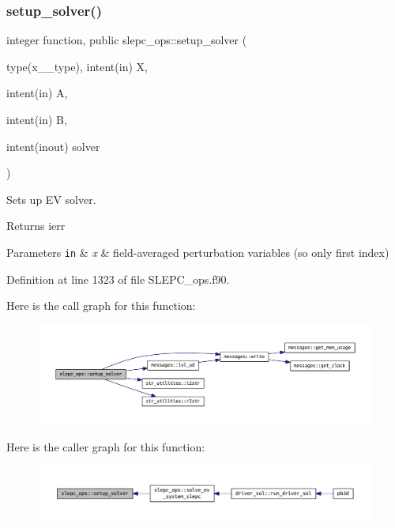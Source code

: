 \subsubsection{\texorpdfstring{setup\+\_\+solver()}{setup\_solver()}}
{\footnotesize\ttfamily integer function, public slepc\+\_\+ops\+::setup\+\_\+solver (\begin{DoxyParamCaption}\item[{type(x\+\_\+2\+\_\+type), intent(in)}]{X,  }\item[{intent(in)}]{A,  }\item[{intent(in)}]{B,  }\item[{intent(inout)}]{solver }\end{DoxyParamCaption})}



Sets up EV solver. 

\begin{DoxyReturn}{Returns}
ierr
\end{DoxyReturn}

\begin{DoxyParams}[1]{Parameters}
\mbox{\tt in}  & {\em x} & field-\/averaged perturbation variables (so only first index) \\
\hline
\end{DoxyParams}


Definition at line 1323 of file S\+L\+E\+P\+C\+\_\+ops.\+f90.

Here is the call graph for this function\+:\nopagebreak
\begin{figure}[H]
\begin{center}
\leavevmode
\includegraphics[width=350pt]{namespaceslepc__ops_af2eb258cbc9d353b95fa71d38570afad_cgraph}
\end{center}
\end{figure}
Here is the caller graph for this function\+:\nopagebreak
\begin{figure}[H]
\begin{center}
\leavevmode
\includegraphics[width=350pt]{namespaceslepc__ops_af2eb258cbc9d353b95fa71d38570afad_icgraph}
\end{center}
\end{figure}
\mbox{\label{namespaceslepc__ops_a79c420987056c225931b51c8d30ece1f}} 
